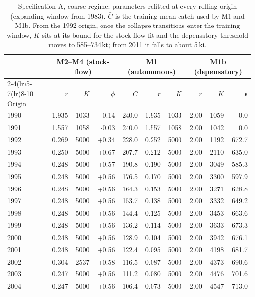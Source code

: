 \documentclass[preprint,11pt,authoryear]{elsarticle}
\theoremstyle{remark}
\newcommand{\sA}{\mathfrak{s}}
\begin{document}
\begin{table}[!htb]
\centering\scriptsize
\setlength{\tabcolsep}{4pt}
\caption{Specification A, coarse regime: parameters refitted at every rolling origin (expanding window from 1983). $\bar C$ is the training-mean catch used by M1 and M1b. From the 1992 origin, once the collapse transitions enter the training window, $K$ sits at its bound for the stock-flow fit and the depensatory threshold moves to 585--734\,kt; from 2011 it falls to about 5\,kt.}
\label{tab:si_rollingA}
\begin{tabular}{@{}lrrrrrrrrr@{}}
\toprule
 & \multicolumn{3}{c}{M2--M4 (stock-flow)} & \multicolumn{3}{c}{M1 (autonomous)} & \multicolumn{3}{c}{M1b (depensatory)} \\
\cmidrule(lr){2-4}\cmidrule(lr){5-7}\cmidrule(lr){8-10}
Origin & $r$ & $K$ & $\phi$ & $\bar C$ & $r$ & $K$ & $r$ & $K$ & $\sA$ \\
\midrule
1990 & 1.935 & 1033 & -0.14 & 240.0 & 1.935 & 1033 & 2.00 & 1059 & 0.0 \\
1991 & 1.557 & 1058 & -0.03 & 240.0 & 1.557 & 1058 & 2.00 & 1042 & 0.0 \\
1992 & 0.269 & 5000 & +0.34 & 228.0 & 0.252 & 5000 & 2.00 & 1192 & 672.7 \\
1993 & 0.250 & 5000 & +0.67 & 207.7 & 0.212 & 5000 & 2.00 & 2110 & 635.0 \\
1994 & 0.248 & 5000 & +0.57 & 190.8 & 0.190 & 5000 & 2.00 & 3049 & 585.3 \\
1995 & 0.248 & 5000 & +0.56 & 176.5 & 0.170 & 5000 & 2.00 & 3300 & 597.9 \\
1996 & 0.248 & 5000 & +0.56 & 164.3 & 0.153 & 5000 & 2.00 & 3271 & 628.8 \\
1997 & 0.248 & 5000 & +0.56 & 153.7 & 0.138 & 5000 & 2.00 & 3332 & 649.2 \\
1998 & 0.248 & 5000 & +0.56 & 144.4 & 0.125 & 5000 & 2.00 & 3453 & 663.6 \\
1999 & 0.248 & 5000 & +0.56 & 136.2 & 0.114 & 5000 & 2.00 & 3633 & 673.3 \\
2000 & 0.248 & 5000 & +0.56 & 128.9 & 0.104 & 5000 & 2.00 & 3942 & 676.1 \\
2001 & 0.248 & 5000 & +0.56 & 122.4 & 0.095 & 5000 & 2.00 & 4198 & 681.7 \\
2002 & 0.304 & 2537 & +0.58 & 116.5 & 0.087 & 5000 & 2.00 & 4373 & 690.6 \\
2003 & 0.247 & 5000 & +0.56 & 111.2 & 0.080 & 5000 & 2.00 & 4476 & 701.6 \\
2004 & 0.247 & 5000 & +0.56 & 106.4 & 0.073 & 5000 & 2.00 & 4547 & 713.0 \\

\end{tabular}
\end{table}
\end{document}
